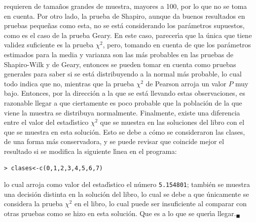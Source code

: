 \begin{solucion}
 requieren de tama\~nos grandes de muestra, mayores a 100,
 por lo que no se toma en cuenta.
 Por otro lado, la prueba de Shapiro, aunque da buenos resultados
 en pruebas peque\~nas como esta, no se est\'a considerando los par\'ametros
 supuestos, como es el caso de la prueba Geary.
 En este caso, parecer\'{\i}a que la \'unica que tiene validez suficiente
 es la prueba $\chi^2$, pero,
 tomando en cuenta de que los par\'ametros estimados para la media y varianza
 son las m\'as probables en las pruebas de Shapiro-Wilk y de Geary,
 entonces se pueden tomar en cuenta como pruebas
 generales para saber si se est\'a distribuyendo a la normal m\'as probable,
 lo cual todo indica que no,
 mientras que la prueba $\chi^2$ de Pearson arroja un valor $P$ muy bajo.
 Entonces, por la direcci\'on a la que se est\'a llevando estas observaciones,
 es razonable llegar a que ciertamente es poco probable
 que la poblaci\'on de la que viene la muestra se distribuya normalmente.
 Finalmente, existe una diferencia entre el valor del estad\'{\i}stico
 $\chi^2$ que se muestra en las soluciones del libro
 con el que se muestra en esta soluci\'on.
 Esto se debe a c\'omo se consideraron las clases,
 de una forma m\'as conservadora,
 y se puede revisar que coincide mejor el resultado
 si se modifica la siguiente l\'{\i}nea en el programa:
 \begin{verbatim}
> clases<-c(0,1,2,3,4,5,6,7)
 \end{verbatim}
 \vspace{-0.5cm}
 lo cual arroja como valor del estad\'{\i}stico el n\'umero
 \texttt{5.154801};
 tambi\'en se muestra una decisi\'on distinta en la soluci\'on del libro,
 lo cual se debe a que \'unicamente se considera la prueba $\chi^2$
 en el libro, lo cual puede ser insuficiente
 al comparar con otras pruebas como se hizo en esta soluci\'on.
 Que es a lo que se quer\'{\i}a llegar.${}_{\blacksquare}$
\end{solucion}
